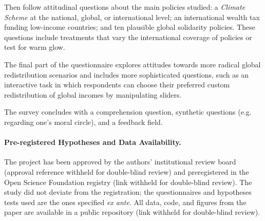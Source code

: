 \documentclass[12pt,english]{article}
\begin{document}
\begin{bibunit}
Then follow attitudinal questions about the main policies studied: a \textit{Climate Scheme} at the national, global, or international level; an international wealth tax funding low-income countries; and ten plausible global solidarity policies. These questions include treatments that vary the international coverage of policies or test for warm glow. 

The final part of the questionnaire explores attitudes towards more radical global redistribution scenarios and includes more sophisticated questions, such as an interactive task in which respondents can choose their preferred custom redistribution of global incomes by manipulating sliders. 

The survey concludes with a comprehension question, synthetic questions (e.g. regarding one's moral circle), and a feedback field.



\paragraph{Pre-registered Hypotheses and Data Availability.}
The project has been approved by the authors' institutional review board (approval reference withheld for double-blind review) and
preregistered in the Open Science Foundation registry (link withheld for double-blind review). The study did not deviate from the registration; the questionnaires and hypotheses tests used are the ones specified \textit{ex ante}. All data, code, and figures from the paper are available in a public repository (link withheld for double-blind review).


\end{bibunit}
\end{document}
